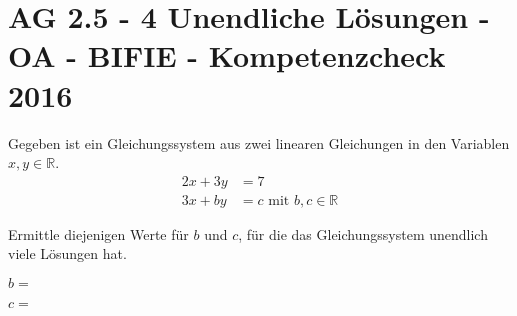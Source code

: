 \section{AG 2.5 - 4 Unendliche Lösungen - OA - BIFIE - Kompetenzcheck 2016}

\begin{beispiel}[AG 2.5]{1} %
				Gegeben ist ein Gleichungssystem aus zwei linearen Gleichungen in den Variablen $x,y\in\mathbb{R}$.\\

\begin{align}
2x+3y &=7\\
3x+by &=c \text{ mit } b,c\in\mathbb{R}
\end{align}

Ermittle diejenigen Werte für $b$ und $c$, für die das Gleichungssystem unendlich viele Lösungen hat.
\leer

$b=$ 
\leer

$c=$ 
\end{beispiel}	